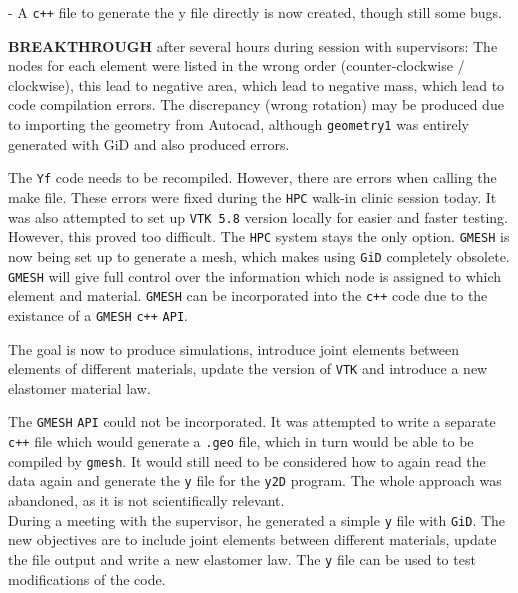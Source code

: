 \bigbreak
{} - {\color{blue}\textbf{}}
A \texttt{c++} file to generate the y file directly is now created, though still some bugs.

\bigbreak
{}
\textbf{BREAKTHROUGH} after several hours during session with supervisors: The nodes for each element were listed in the wrong order (counter-clockwise / clockwise), this lead to negative area, which lead to negative mass, which lead to code compilation errors. The discrepancy (wrong rotation) may be produced due to importing the geometry from Autocad, although \texttt{geometry1} was entirely generated with GiD and also produced errors.

\bigbreak
{}
The \texttt{Yf} code needs to be recompiled. However, there are errors when calling the make file. These errors were fixed during the \texttt{HPC} walk-in clinic session today. It was also attempted to set up \texttt{VTK 5.8} version locally for easier and faster testing. However, this proved too difficult. The \texttt{HPC} system stays the only option. \texttt{GMESH} is now being set up to generate a mesh, which makes using \texttt{GiD} completely obsolete. \texttt{GMESH} will give full control over the information which node is assigned to which element and material. \texttt{GMESH} can be incorporated into the \texttt{c++} code due to the existance of a \texttt{GMESH} \texttt{c++} \texttt{API}.

\bigbreak
{}\newline
The goal is now to produce simulations, introduce joint elements between elements of different materials, update the version of \texttt{VTK} and introduce a new elastomer material law.

\bigbreak
{}
The \texttt{GMESH} \texttt{API} could not be incorporated. It was attempted to write a separate \texttt{c++} file which would generate a \texttt{.geo} file, which in turn would be able to be compiled by \texttt{gmesh}. It would still need to be considered how to again read the data again and generate the \texttt{y} file for the \texttt{y2D} program. The whole approach was abandoned, as it is not scientifically relevant.\\

During a meeting with the supervisor, he generated a simple \texttt{y} file with \texttt{GiD}. The new objectives are to include joint elements between different materials, update the file output and write a new elastomer law. The \texttt{y} file can be used to test modifications of the code.

